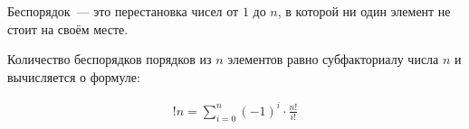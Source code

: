 \begin{definition}
  Беспорядок~--- это перестановка чисел от \(1\) до \(n\), в которой ни один
  элемент не стоит на своём месте.
\end{definition}

\begin{theorem}
  Количество беспорядков порядков из \(n\) элементов равно субфакториалу числа
  \(n\) и вычисляется о формуле:
  
  \begin{align*}
    !n = \sum_{i = 0}^{n} (-1)^{i} \cdot \frac{n!}{i!}
  \end{align*}
\end{theorem}
